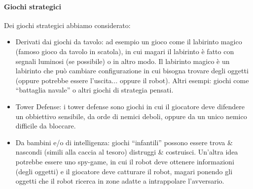 \paragraph{Giochi strategici} Dei giochi strategici abbiamo considerato:
\begin{itemize}
\item Derivati dai giochi da tavolo: ad esempio un gioco come il labirinto magico (famoso gioco da tavolo in scatola), in cui magari il labirinto è fatto con segnali luminosi (se possibile) o in altro modo. Il labirinto magico è un labirinto che può cambiare configurazione in cui bisogna trovare degli oggetti (oppure potrebbe essere l’uscita... oppure il robot). Altri esempi: giochi come “battaglia navale” o altri giochi di strategia pensati.
\item Tower Defense: i tower defense sono giochi in cui il giocatore deve difendere un obbiettivo sensibile, da orde di nemici deboli, oppure da un unico nemico difficile da bloccare. 
\item Da bambini e/o di intelligenza: giochi “infantili” possono essere trova \& nascondi (simili alla caccia al tesoro) distruggi \& costruisci. Un'altra idea potrebbe essere uno spy-game, in cui il robot deve ottenere informazioni (degli oggetti) e il giocatore deve catturare il robot, magari ponendo gli oggetti che il robot ricerca in zone adatte a intrappolare l'avversario.
\end{itemize}

